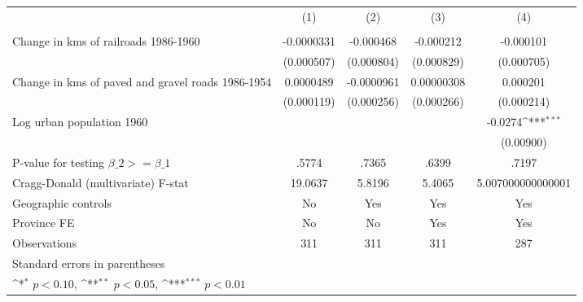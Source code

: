 {
\def\sym#1{\ifmmode^{#1}\else\(^{#1}\)\fi}
\begin{tabular}{l*{4}{c}}
\hline\hline
                &\multicolumn{1}{c}{(1)}&\multicolumn{1}{c}{(2)}&\multicolumn{1}{c}{(3)}&\multicolumn{1}{c}{(4)}\\
                &\multicolumn{1}{c}{}&\multicolumn{1}{c}{}&\multicolumn{1}{c}{}&\multicolumn{1}{c}{}\\
\hline
Change in kms of railroads 1986-1960&-0.0000331         &-0.000468         &-0.000212         &-0.000101         \\
                &(0.000507)         &(0.000804)         &(0.000829)         &(0.000705)         \\
[1em]
Change in kms of paved and gravel roads 1986-1954&0.0000489         &-0.0000961         &0.00000308         & 0.000201         \\
                &(0.000119)         &(0.000256)         &(0.000266)         &(0.000214)         \\
[1em]
Log urban population 1960&                  &                  &                  &  -0.0274\sym{***}\\
                &                  &                  &                  &(0.00900)         \\
\hline
P-value for testing $\beta\_{2} >= \beta\_{1}$&    .5774         &    .7365         &    .6399         &    .7197         \\
Cragg-Donald (multivariate) F-stat&  19.0637         &   5.8196         &   5.4065         &5.007000000000001         \\
Geographic controls&       No         &      Yes         &      Yes         &      Yes         \\
Province FE     &       No         &       No         &      Yes         &      Yes         \\
Observations    &      311         &      311         &      311         &      287         \\
\hline\hline
\multicolumn{5}{l}{\footnotesize Standard errors in parentheses}\\
\multicolumn{5}{l}{\footnotesize \sym{*} \(p<0.10\), \sym{**} \(p<0.05\), \sym{***} \(p<0.01\)}\\
\end{tabular}
}
